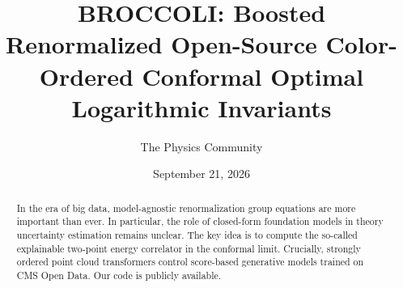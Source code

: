 \documentclass[11pt]{article}
\title{BROCCOLI: Boosted Renormalized Open-Source Color-Ordered Conformal Optimal Logarithmic Invariants}
\author{The Physics Community}
\date{September 21, 2026}
\numberwithin{equation}{section}
\theoremstyle{definition}
\theoremstyle{remark}
\begin{document}
\maketitle
\begin{abstract}
In the era of big data, model-agnostic renormalization group equations
are more important than ever. In particular, the role of closed-form
foundation models in theory uncertainty estimation remains unclear. The
key idea is to compute the so-called explainable two-point energy
correlator in the conformal limit. Crucially, strongly ordered point
cloud transformers control score-based generative models trained on CMS
Open Data. Our code is publicly available.
\end{abstract}
\tableofcontents



\nocite{*}


\end{document}
